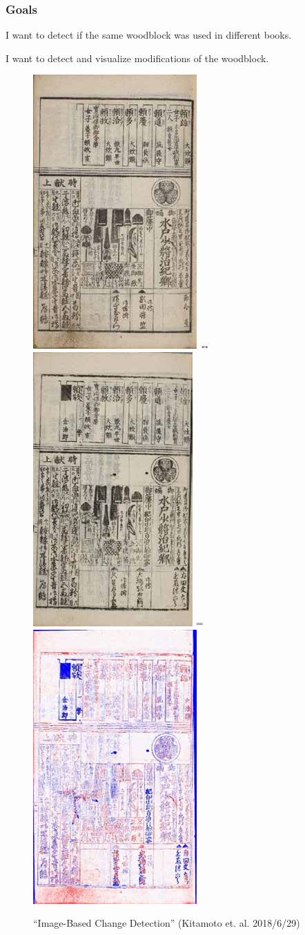 \documentclass{beamer}
\begin{document}
  \begin{frame}
    \frametitle{Goals}
    I want to detect if the same woodblock was used in different books. \vspace{0.5em}

    I want to detect and visualize modifications of the woodblock. \vspace{0.5em}
    \begin{figure}
      \centering
      \Huge
      \includegraphics[width=0.2\linewidth]{book1} ↔
      \includegraphics[width=0.2\linewidth]{book2} =
      \includegraphics[width=0.2\linewidth]{bookdiff}
      \caption{``Image-Based Change Detection'' (Kitamoto et. al. 2018/6/29)}
    \end{figure}
  \end{frame}
\end{document}
